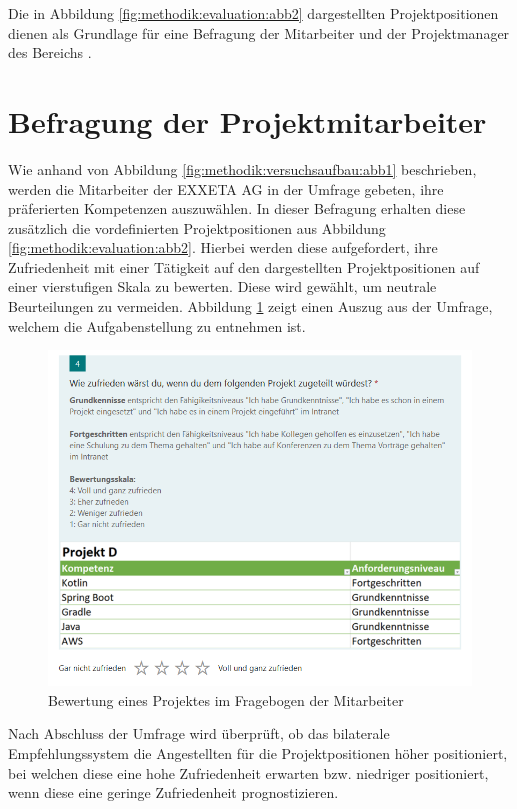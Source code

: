 Die in Abbildung \ref{fig:methodik:evaluation:abb2} dargestellten Projektpositionen dienen als Grundlage für eine Befragung der Mitarbeiter und der Projektmanager des Bereichs \JES.

\section{Befragung der Projektmitarbeiter}
\label{ch:methodik:evaluation:mitarbeiter}
Wie anhand von Abbildung \ref{fig:methodik:versuchsaufbau:abb1} beschrieben, werden die Mitarbeiter der EXXETA AG in der Umfrage gebeten, ihre präferierten Kompetenzen auszuwählen. In dieser Befragung erhalten diese zusätzlich die vordefinierten Projektpositionen aus Abbildung \ref{fig:methodik:evaluation:abb2}. Hierbei werden diese aufgefordert, ihre Zufriedenheit mit einer Tätigkeit auf den dargestellten Projektpositionen auf einer vierstufigen Skala zu bewerten. Diese wird gewählt, um neutrale Beurteilungen zu vermeiden. Abbildung \ref{fig:methodik:evaluation:abb1} zeigt einen Auszug aus der Umfrage, welchem die Aufgabenstellung zu entnehmen ist.

\begin{figure}[h]
	\centering
	\includegraphics[width=1\textwidth]{gfx/projekt-umfrage.png}
	\caption{Bewertung eines Projektes im Fragebogen der Mitarbeiter}
	\label{fig:methodik:evaluation:abb1}
\end{figure}

Nach Abschluss der Umfrage wird überprüft, ob das bilaterale Empfehlungssystem die Angestellten für die Projektpositionen höher positioniert, bei welchen diese eine hohe Zufriedenheit erwarten bzw. niedriger positioniert, wenn diese eine geringe Zufriedenheit prognostizieren.

